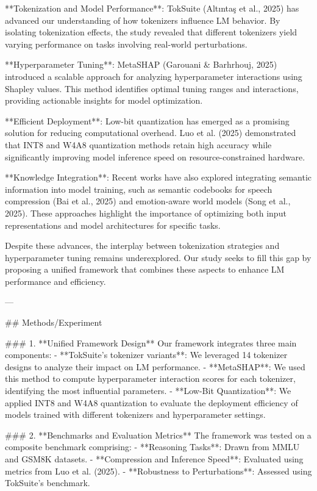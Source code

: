 **Tokenization and Model Performance**: TokSuite (Altıntaş et al., 2025) has advanced our understanding of how tokenizers influence LM behavior. By isolating tokenization effects, the study revealed that different tokenizers yield varying performance on tasks involving real-world perturbations.  

**Hyperparameter Tuning**: MetaSHAP (Garouani & Barhrhouj, 2025) introduced a scalable approach for analyzing hyperparameter interactions using Shapley values. This method identifies optimal tuning ranges and interactions, providing actionable insights for model optimization.  

**Efficient Deployment**: Low-bit quantization has emerged as a promising solution for reducing computational overhead. Luo et al. (2025) demonstrated that INT8 and W4A8 quantization methods retain high accuracy while significantly improving model inference speed on resource-constrained hardware.  

**Knowledge Integration**: Recent works have also explored integrating semantic information into model training, such as semantic codebooks for speech compression (Bai et al., 2025) and emotion-aware world models (Song et al., 2025). These approaches highlight the importance of optimizing both input representations and model architectures for specific tasks.  

Despite these advances, the interplay between tokenization strategies and hyperparameter tuning remains underexplored. Our study seeks to fill this gap by proposing a unified framework that combines these aspects to enhance LM performance and efficiency.  

---

## Methods/Experiment  

### 1. **Unified Framework Design**  
Our framework integrates three main components:  
- **TokSuite's tokenizer variants**: We leveraged 14 tokenizer designs to analyze their impact on LM performance.  
- **MetaSHAP**: We used this method to compute hyperparameter interaction scores for each tokenizer, identifying the most influential parameters.  
- **Low-Bit Quantization**: We applied INT8 and W4A8 quantization to evaluate the deployment efficiency of models trained with different tokenizers and hyperparameter settings.  

### 2. **Benchmarks and Evaluation Metrics**  
The framework was tested on a composite benchmark comprising:  
- **Reasoning Tasks**: Drawn from MMLU and GSM8K datasets.  
- **Compression and Inference Speed**: Evaluated using metrics from Luo et al. (2025).  
- **Robustness to Perturbations**: Assessed using TokSuite's benchmark.  

